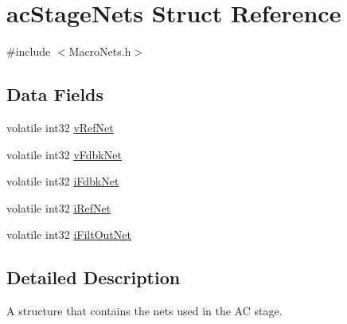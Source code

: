 \hypertarget{a00003}{\section{ac\-Stage\-Nets Struct Reference}
\label{a00003}
}


{\ttfamily \#include $<$Macro\-Nets.\-h$>$}

\subsection*{Data Fields}
\begin{DoxyCompactItemize}
\item 
volatile int32 \hyperlink{a00003_a60c47bf62f481657a9548acf5115bdcc}{v\-Ref\-Net}
\item 
volatile int32 \hyperlink{a00003_a2fa47f230edc315908ef3c7594572d40}{v\-Fdbk\-Net}
\item 
volatile int32 \hyperlink{a00003_a4e528cf0beafdcc7ab51f05980c719b3}{i\-Fdbk\-Net}
\item 
volatile int32 \hyperlink{a00003_aef9fb780c943a15cfcf991e330f13d26}{i\-Ref\-Net}
\item 
volatile int32 \hyperlink{a00003_a4d5d9d0263738ce9262cdbd4db0e404b}{i\-Filt\-Out\-Net}
\end{DoxyCompactItemize}


\subsection{Detailed Description}
A structure that contains the nets used in the A\-C stage. 

